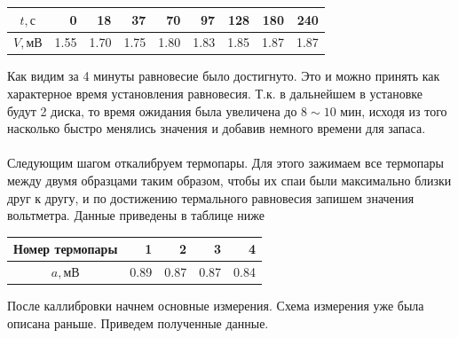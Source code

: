 \documentclass[a4paper, 12pt]{article}
\begin{document}
    \begin{table}[h]
        \begin{center}
            \begin{tabular}{|c|r|r|r|r|r|r|r|r|}
                \hline
                $t, с$ & 0 & 18 & 37 & 70 & 97 & 128 & 180 & 240 \\\hline
                $V, мВ$ & 1.55 & 1.70 & 1.75 & 1.80 & 1.83 & 1.85 & 1.87 & 1.87 \\\hline
            \end{tabular}
        \end{center}
    \end{table}

    Как видим за 4 минуты равновесие было достигнуто. Это и можно принять как характерное время установления равновесия. Т.к. в дальнейшем в установке будут 2 диска, то время ожидания была увеличена до $8\sim10$ мин, исходя из того насколько быстро менялись значения и добавив немного времени для запаса.

    \paragraph{}
    Следующим шагом откалибруем термопары. Для этого зажимаем все термопары между двумя образцами таким образом, чтобы их спаи были максимально близки друг к другу, и по достижению термального равновесия запишем значения вольтметра. Данные приведены в таблице ниже

    \begin{table}[h]
        \begin{center}
            \begin{tabular}{|c|r|r|r|r|}
                \hline
                Номер термопары & 1 &  2 &  3 &  4\\
                \hline
                $a, мВ$ &   0.89 &  0.87 &  0.87 &  0.84\\\hline
            \end{tabular}
        \end{center}
    \end{table}

    После каллибровки начнем основные измерения. Схема измерения уже была описана раньше. Приведем полученные данные.
\end{document}
